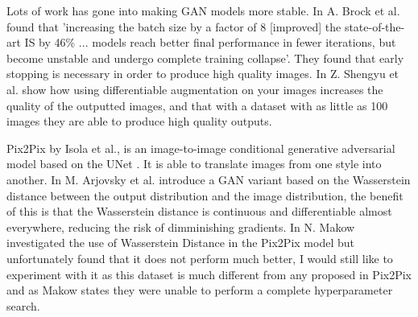 \documentclass{UoYCSproject}
\begin{document}
Lots of work has gone into making GAN models more stable. In \cite{brock2019large} A. Brock et al. found that 'increasing the batch size by a factor of 8 [improved] the state-of-the-art IS by 46\% ... models reach better final performance in fewer iterations, but become unstable and undergo
complete training collapse'. They found that early stopping is necessary in order to produce high quality images. In \cite{zhao2020differentiable} Z. Shengyu et al. show how using differentiable augmentation on your images increases the quality of the outputted images, and that with a dataset with as little as 100 images they are able to produce high quality outputs. 


Pix2Pix by Isola et al.\cite{isola2018imagetoimage}, is an image-to-image conditional generative adversarial model based on the UNet \cite{ronneberger2015unet}. It is able to translate images from one style into another. In \cite{arjovsky2017wasserstein} M. Arjovsky et al. introduce a GAN variant based on the Wasserstein distance between the output distribution and the image distribution, the benefit of this is that the Wasserstein distance is continuous and differentiable almost everywhere, reducing the risk of dimminishing gradients. In \cite{pix2pixwasserstein} N. Makow investigated the use of Wasserstein Distance in the Pix2Pix model but unfortunately found that it does not perform much better, I would still like to experiment with it as this dataset is much different from any proposed in Pix2Pix and as Makow states they were unable to perform a complete hyperparameter search.
\end{document}
